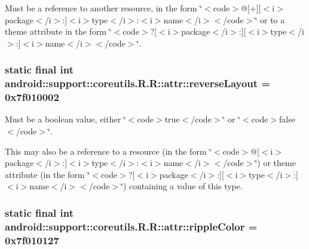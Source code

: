 Must be a reference to another resource, in the form \char`\"{}$<$code$>$@\mbox{[}+\mbox{]}\mbox{[}$<$i$>$package$<$/i$>$:\mbox{]}$<$i$>$type$<$/i$>$:$<$i$>$name$<$/i$>$$<$/code$>$\char`\"{} or to a theme attribute in the form \char`\"{}$<$code$>$?\mbox{[}$<$i$>$package$<$/i$>$:\mbox{]}\mbox{[}$<$i$>$type$<$/i$>$:\mbox{]}$<$i$>$name$<$/i$>$$<$/code$>$\char`\"{}. \hypertarget{classandroid_1_1support_1_1coreutils_1_1_r_1_1attr_cd827d62b50ef3a477972e66f5489c83}{
\subsubsection[{reverseLayout}]{\setlength{\rightskip}{0pt plus 5cm}static final int android::support::coreutils.R.R::attr::reverseLayout = 0x7f010002}}
\label{classandroid_1_1support_1_1coreutils_1_1_r_1_1attr_cd827d62b50ef3a477972e66f5489c83}


Must be a boolean value, either \char`\"{}$<$code$>$true$<$/code$>$\char`\"{} or \char`\"{}$<$code$>$false$<$/code$>$\char`\"{}. 

This may also be a reference to a resource (in the form \char`\"{}$<$code$>$@\mbox{[}$<$i$>$package$<$/i$>$:\mbox{]}$<$i$>$type$<$/i$>$:$<$i$>$name$<$/i$>$$<$/code$>$\char`\"{}) or theme attribute (in the form \char`\"{}$<$code$>$?\mbox{[}$<$i$>$package$<$/i$>$:\mbox{]}\mbox{[}$<$i$>$type$<$/i$>$:\mbox{]}$<$i$>$name$<$/i$>$$<$/code$>$\char`\"{}) containing a value of this type. \hypertarget{classandroid_1_1support_1_1coreutils_1_1_r_1_1attr_d2e6af04578a6944c1b0c6c8dbd256f5}{
\subsubsection[{rippleColor}]{\setlength{\rightskip}{0pt plus 5cm}static final int android::support::coreutils.R.R::attr::rippleColor = 0x7f010127}}
\label{classandroid_1_1support_1_1coreutils_1_1_r_1_1attr_d2e6af04578a6944c1b0c6c8dbd256f5}


